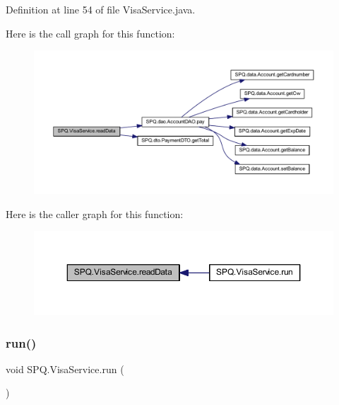 Definition at line 54 of file Visa\+Service.\+java.

Here is the call graph for this function\+:
\nopagebreak
\begin{figure}[H]
\begin{center}
\leavevmode
\includegraphics[width=350pt]{class_s_p_q_1_1_visa_service_a9f06022375e8bd98b78a8268bdc4ff05_cgraph}
\end{center}
\end{figure}
Here is the caller graph for this function\+:
\nopagebreak
\begin{figure}[H]
\begin{center}
\leavevmode
\includegraphics[width=350pt]{class_s_p_q_1_1_visa_service_a9f06022375e8bd98b78a8268bdc4ff05_icgraph}
\end{center}
\end{figure}
\mbox{\label{class_s_p_q_1_1_visa_service_a4e9434dfb98d1ff247d29794ac96909e}} 
\subsubsection{\texorpdfstring{run()}{run()}}
{\footnotesize\ttfamily void S\+P\+Q.\+Visa\+Service.\+run (\begin{DoxyParamCaption}{ }\end{DoxyParamCaption})}



